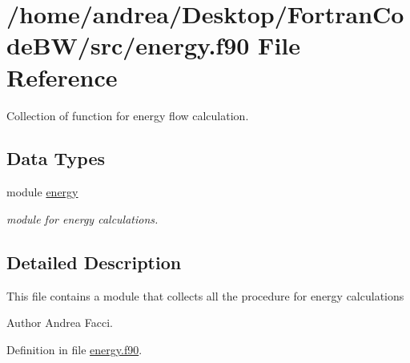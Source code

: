 \hypertarget{energy_8f90}{\section{/home/andrea/\-Desktop/\-Fortran\-Code\-B\-W/src/energy.f90 File Reference}
\label{energy_8f90}
}


Collection of function for energy flow calculation.  


\subsection*{Data Types}
\begin{DoxyCompactItemize}
\item 
module \hyperlink{classenergy}{energy}
\begin{DoxyCompactList}\small\item\em module for energy calculations. \end{DoxyCompactList}\end{DoxyCompactItemize}


\subsection{Detailed Description}
This file contains a module that collects all the procedure for energy calculations \begin{DoxyAuthor}{Author}
Andrea Facci. 
\end{DoxyAuthor}


Definition in file \hyperlink{energy_8f90_source}{energy.\-f90}.

